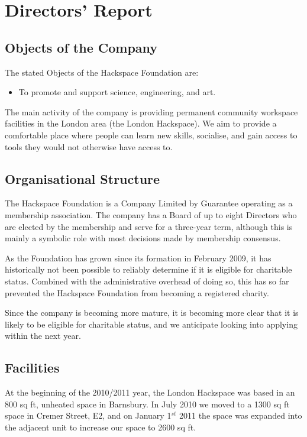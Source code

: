 \section{Directors' Report}

\subsection{Objects of the Company}

The stated Objects of the Hackspace Foundation are:

\begin{itemize}
    \item To promote and support science, engineering, and art.
\end{itemize}

The main activity of the company is providing permanent community workspace facilities in the London area (the London Hackspace).
We aim to provide a comfortable place where people can learn new skills, socialise, and gain access to tools they would not otherwise have access to.

\subsection{Organisational Structure}\label{ref_structure}

The Hackspace Foundation is a Company Limited by Guarantee operating as a membership association.
The company has a Board of up to eight Directors who are elected by the membership and serve for a three-year term,
although this is mainly a symbolic role with most decisions made by membership consensus.

As the Foundation has grown since its formation in February 2009, it has historically not been possible
to reliably determine if it is eligible for charitable status. Combined with the administrative overhead of doing so,
this has so far prevented the Hackspace Foundation from becoming a registered charity.

Since the company is becoming more mature, it is becoming more clear that it is likely to be eligible for charitable status,
and we anticipate looking into applying within the next year.

\subsection{Facilities}

At the beginning of the 2010/2011 year, the London Hackspace was based in an 800 sq ft, unheated space in Barnsbury.
In July 2010 we moved to a 1300 sq ft space in Cremer Street, E2, and on January 1\(^{st}\) 2011 the space was expanded into
the adjacent unit to increase our space to 2600 sq ft.

